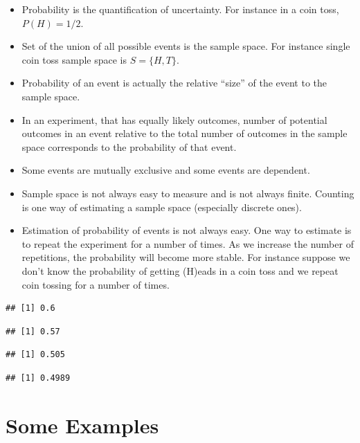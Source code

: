 \documentclass[]{book}
\providecommand{\tightlist}{%
  \setlength{\itemsep}{0pt}\setlength{\parskip}{0pt}}
\theoremstyle{definition}
\theoremstyle{definition}
\theoremstyle{definition}
\theoremstyle{remark}
\begin{document}
\begin{itemize}
\tightlist
\item
  Probability is the quantification of uncertainty. For instance in a
  coin toss, \(P(H) = 1/2\).
\item
  Set of the union of all possible events is the sample space. For
  instance single coin toss sample space is \(S = \{H,T\}\).
\item
  Probability of an event is actually the relative ``size'' of the event
  to the sample space.
\item
  In an experiment, that has equally likely outcomes, number of
  potential outcomes in an event relative to the total number of
  outcomes in the sample space corresponds to the probability of that
  event.
\item
  Some events are mutually exclusive and some events are dependent.
\item
  Sample space is not always easy to measure and is not always finite.
  Counting is one way of estimating a sample space (especially discrete
  ones).
\item
  Estimation of probability of events is not always easy. One way to
  estimate is to repeat the experiment for a number of times. As we
  increase the number of repetitions, the probability will become more
  stable. For instance suppose we don't know the probability of getting
  (H)eads in a coin toss and we repeat coin tossing for a number of
  times.
\end{itemize}

\begin{verbatim}
## [1] 0.6
\end{verbatim}

\begin{verbatim}
## [1] 0.57
\end{verbatim}

\begin{verbatim}
## [1] 0.505
\end{verbatim}

\begin{verbatim}
## [1] 0.4989
\end{verbatim}

\hypertarget{some-examples}{%
\section{Some Examples}\label{some-examples}}
\end{document}
